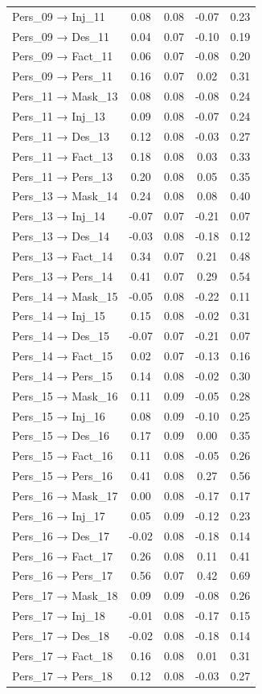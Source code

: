\documentclass[
  man, donotrepeattitle,floatsintext]{apa6}
\begin{document}
\begin{center}
\begin{ThreePartTable}
{\begin{longtable}{lcccc}
Pers\_09 → Inj\_11 & 0.08 & 0.08 & -0.07 & 0.23\\
Pers\_09 → Des\_11 & 0.04 & 0.07 & -0.10 & 0.19\\
Pers\_09 → Fact\_11 & 0.06 & 0.07 & -0.08 & 0.20\\
Pers\_09 → Pers\_11 & 0.16 & 0.07 & 0.02 & 0.31\\
Pers\_11 → Mask\_13 & 0.08 & 0.08 & -0.08 & 0.24\\
Pers\_11 → Inj\_13 & 0.09 & 0.08 & -0.07 & 0.24\\
Pers\_11 → Des\_13 & 0.12 & 0.08 & -0.03 & 0.27\\
Pers\_11 → Fact\_13 & 0.18 & 0.08 & 0.03 & 0.33\\
Pers\_11 → Pers\_13 & 0.20 & 0.08 & 0.05 & 0.35\\
Pers\_13 → Mask\_14 & 0.24 & 0.08 & 0.08 & 0.40\\
Pers\_13 → Inj\_14 & -0.07 & 0.07 & -0.21 & 0.07\\
Pers\_13 → Des\_14 & -0.03 & 0.08 & -0.18 & 0.12\\
Pers\_13 → Fact\_14 & 0.34 & 0.07 & 0.21 & 0.48\\
Pers\_13 → Pers\_14 & 0.41 & 0.07 & 0.29 & 0.54\\
Pers\_14 → Mask\_15 & -0.05 & 0.08 & -0.22 & 0.11\\
Pers\_14 → Inj\_15 & 0.15 & 0.08 & -0.02 & 0.31\\
Pers\_14 → Des\_15 & -0.07 & 0.07 & -0.21 & 0.07\\
Pers\_14 → Fact\_15 & 0.02 & 0.07 & -0.13 & 0.16\\
Pers\_14 → Pers\_15 & 0.14 & 0.08 & -0.02 & 0.30\\
Pers\_15 → Mask\_16 & 0.11 & 0.09 & -0.05 & 0.28\\
Pers\_15 → Inj\_16 & 0.08 & 0.09 & -0.10 & 0.25\\
Pers\_15 → Des\_16 & 0.17 & 0.09 & 0.00 & 0.35\\
Pers\_15 → Fact\_16 & 0.11 & 0.08 & -0.05 & 0.26\\
Pers\_15 → Pers\_16 & 0.41 & 0.08 & 0.27 & 0.56\\
Pers\_16 → Mask\_17 & 0.00 & 0.08 & -0.17 & 0.17\\
Pers\_16 → Inj\_17 & 0.05 & 0.09 & -0.12 & 0.23\\
Pers\_16 → Des\_17 & -0.02 & 0.08 & -0.18 & 0.14\\
Pers\_16 → Fact\_17 & 0.26 & 0.08 & 0.11 & 0.41\\
Pers\_16 → Pers\_17 & 0.56 & 0.07 & 0.42 & 0.69\\
Pers\_17 → Mask\_18 & 0.09 & 0.09 & -0.08 & 0.26\\
Pers\_17 → Inj\_18 & -0.01 & 0.08 & -0.17 & 0.15\\
Pers\_17 → Des\_18 & -0.02 & 0.08 & -0.18 & 0.14\\
Pers\_17 → Fact\_18 & 0.16 & 0.08 & 0.01 & 0.31\\
Pers\_17 → Pers\_18 & 0.12 & 0.08 & -0.03 & 0.27\\
\bottomrule
\end{longtable}

}
\end{ThreePartTable}
\end{center}
\end{document}
